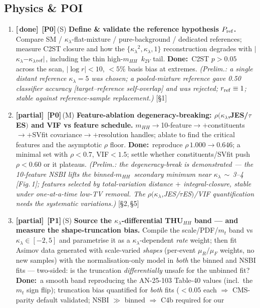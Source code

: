 \documentclass[11pt]{article}
\newcommand{\kl}{\ensuremath{\kappa_\lambda}}
\newcommand{\mhh}{\ensuremath{m_{HH}}}
\newcommand{\priZ}{\textcolor{red!75!black}{\textbf{[P0]}}}
\newcommand{\priO}{\textcolor{orange!85!black}{\textbf{[P1]}}}
\newcommand{\eff}[1]{{\footnotesize\textcolor{gray!65!black}{(#1)}}}
\newcommand{\sref}[1]{ {\footnotesize\textcolor{gray!60!black}{[#1]}}}
\newcommand{\dw}{\textcolor{green!30!black}{\textbf{Done:}}~}
\newcommand{\stDone}{\textcolor{green!50!black}{\textbf{[\checkmark\,done]}}}
\newcommand{\stPart}{\textcolor{orange!90!black}{\textbf{[partial]}}}
\begin{document}
\subsection*{Physics \& POI}
\begin{enumerate}[resume,leftmargin=2.6em]\small
\item \stDone\ \priZ\,\eff{S} \textbf{Define \& validate the reference hypothesis $P_{\rm ref}$.} Compare SM /
\kl-flat-mixture / pure-background / dedicated references; measure C2ST closure and how the
$\{$\kl$^2,$\kl$,1\}$ reconstruction degrades with $|$\kl$-$\kl$_{\rm ref}|$, including the thin high-\mhh\
$k_{2V}$ tail. \dw C2ST $p>0.05$ across the scan, $|\log r|<10$, $<5\%$ basis bias at extremes.
\textcolor{green!45!black}{\emph{\small(Prelim.: a single \emph{distant} reference \kl$=5$ was chosen; a
pooled-mixture reference gave 0.50 classifier accuracy [target--reference self-overlap] and was rejected;
$r_{\rm ref}\equiv1$; stable against reference-sample replacement.)}} \sref{\S1}
\item \stPart\ \priZ\,\eff{M} \textbf{Feature-ablation degeneracy-breaking: $\rho($\kl,JES/$\tau$ES$)$ and VIF vs feature
schedule.} \mhh$\to$10-feature$\to+$constituents$\to+$SVfit covariance$\to+$resolution handles; ablate to find the
critical features and the asymptotic $\rho$ floor. \dw reproduce $\rho\,1.000\to0.646$; a minimal set with
$\rho<0.7$, VIF$<1.5$; settle whether constituents/SVfit push $\rho<0.60$ or it plateaus.
\textcolor{orange!75!black}{\emph{\small(Prelim.: the \emph{degeneracy-break is demonstrated} --- the 10-feature
NSBI lifts the binned-\mhh\ secondary minimum near \kl$\,\sim\,$3--4 [Fig.\,1]; features selected by
total-variation distance $+$ integral-closure, stable under one-at-a-time low-TV removal. The
$\rho($\kl,JES/$\tau$ES$)$/VIF quantification needs the systematic variations.)}} \sref{\S2,\,\S5}
\item \stPart\ \priO\,\eff{S} \textbf{Source the \kl-differential THU$_{HH}$ band --- and measure the
shape-truncation bias.} Compile the scale/PDF/$m_t$ band vs \kl$\in[-2,5]$ and parametrise it as a
\kl-dependent \emph{rate} weight; then fit Asimov data generated with scale-varied \emph{shapes} (per-event
$\mu_R/\mu_F$ weights, no new samples) with the normalisation-only model in \emph{both} the binned and NSBI fits
--- two-sided: is the truncation \emph{differentially} unsafe for the unbinned fit? \dw a smooth band reproducing
the AN-25-103 Table-40 values (incl.\ the $m_t$ sign flip); truncation bias quantified for \emph{both} fits
($<0.05$ each $\Rightarrow$ CMS-parity default validated; NSBI $\gg$ binned $\Rightarrow$ C4b required for our

\end{enumerate}
\end{document}
